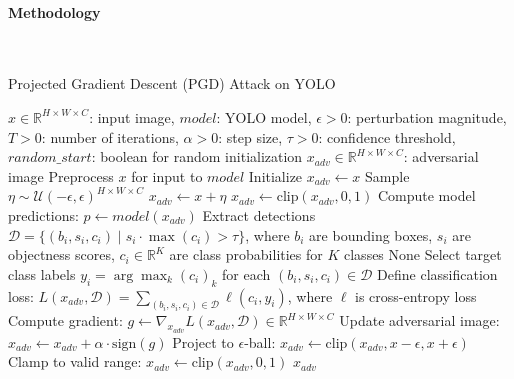 \documentclass[../main.tex]{subfiles}
\begin{document}
\paragraph{Methodology}\leavevmode\\
\begin{breakablealgorithm}{Projected Gradient Descent (PGD) Attack on YOLO}
\begin{algorithmic}[1]
\Require $x \in \mathbb{R}^{H \times W \times C}$: input image, $model$: YOLO model, $\epsilon > 0$: perturbation magnitude, $T > 0$: number of iterations, $\alpha > 0$: step size, $\tau > 0$: confidence threshold, $random\_start$: boolean for random initialization
\Ensure $x_{adv} \in \mathbb{R}^{H \times W \times C}$: adversarial image
\State Preprocess $x$ for input to $model$ 
\State Initialize $x_{adv} \gets x$ 
    \State Sample $\eta \sim \mathcal{U}(-\epsilon, \epsilon)^{H \times W \times C}$ 
    \State $x_{adv} \gets x + \eta$
    \State $x_{adv} \gets \text{clip}(x_{adv}, 0, 1)$ 
\EndIf
{}
    \State Compute model predictions: $p \gets model(x_{adv})$ 
    \State Extract detections $\mathcal{D} = \{ (b_i, s_i, c_i) \mid s_i \cdot \max(c_i) > \tau \}$, where $b_i$ are bounding boxes, $s_i$ are objectness scores, $c_i \in \mathbb{R}^K$ are class probabilities for $K$ classes
        \State \Return None 
    \EndIf
    \State Select target class labels $y_i = \arg\max_k (c_i)_k$ for each $(b_i, s_i, c_i) \in \mathcal{D}$
    \State Define classification loss: $L(x_{adv}, \mathcal{D}) = \sum_{(b_i, s_i, c_i) \in \mathcal{D}} \ell(c_i, y_i)$, where $\ell$ is cross-entropy loss
    \State Compute gradient: $g \gets \nabla_{x_{adv}} L(x_{adv}, \mathcal{D}) \in \mathbb{R}^{H \times W \times C}$ 
    \State Update adversarial image: $x_{adv} \gets x_{adv} + \alpha \cdot \text{sign}(g)$
    \State Project to $\epsilon$-ball: $x_{adv} \gets \text{clip}(x_{adv}, x - \epsilon, x + \epsilon)$ 
    \State Clamp to valid range: $x_{adv} \gets \text{clip}(x_{adv}, 0, 1)$ 
\EndFor
\State \Return $x_{adv}$
\end{algorithmic}
\end{breakablealgorithm}
\end{document}
